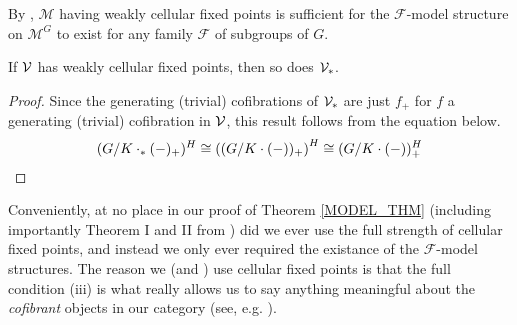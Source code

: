 \documentclass[a4paper,10pt
,draft
]{article}%
\renewcommand{\F}{\mathcal F}
\renewcommand{\1}{\eta}%
\begin{document}
\begin{remark}
      By \cite[Rem. 2.8]{Ste16}, $\mathcal M$ having weakly cellular fixed points is sufficient for the 
      $\F$-model structure on $\mathcal M^G$ to exist for any family $\F$ of subgroups of $G$.
\end{remark}

\begin{lemma}
      If $\mathcal V$ has weakly cellular fixed points, then so does $\V_{\**}$.
\end{lemma}
\begin{proof}
      Since the generating (trivial) cofibrations of $\V_{\**}$ are just $f_+$ for $f$ a generating (trivial) cofibration in $\mathcal V$,
      this result follows from the equation below.
      \begin{equation}
            (G/K \cdot_{\**} (-)_+)^H \cong \left( (G/K \cdot (-))_+ \right)^H \cong (G/K \cdot (-))^H_+
      \end{equation}
\end{proof}

\begin{remark}
      \label{WEAKCELL_REM}
      Conveniently, at no place in our proof of Theorem \ref{MODEL_THM} (including importantly Theorem I and II from \cite{BP_geo})
      did we ever use the full strength of cellular fixed points,
      and instead we only ever required the existance of the $\F$-model structures.
      The reason we (and \cite{Ste16}) use cellular fixed points is that the full condition (iii) is what really allows us to say anything meaningful about the \textit{cofibrant} objects in our category (see, e.g. \cite[Prop. 6.56 and Lemma 6.59]{BP_geo}).
\end{remark}
\end{document}
